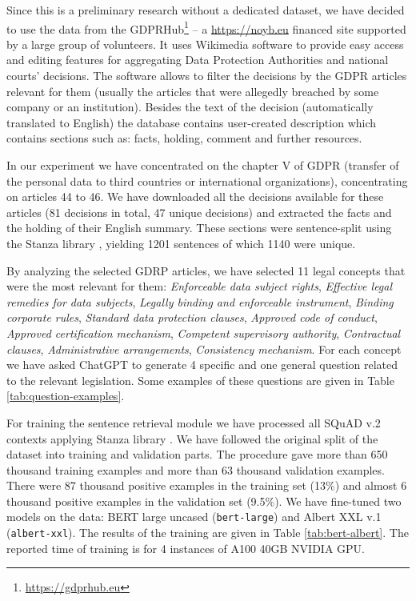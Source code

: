 Since this is a preliminary research without a dedicated dataset, we have decided to use the data from the GDPRHub\footnote{\url{https://gdprhub.eu}} -- a \url{https://noyb.eu} financed site supported by
a large group of volunteers. It uses Wikimedia software to provide easy access and editing features for 
aggregating Data Protection Authorities and national courts' decisions. The software  allows to filter the 
decisions by the GDPR articles relevant for them (usually the articles that were allegedly breached by some 
company or an institution). Besides the text of the decision (automatically translated to English) the database
contains user-created description which contains sections such as: facts, holding, comment and further resources.

In our experiment we have concentrated on the chapter V of GDPR (transfer of the personal data to third countries or 
international organizations), concentrating on articles 44 to 46. We have downloaded all the decisions available for 
these articles (81 decisions in total, 47 unique decisions) and extracted the facts and the holding of their English 
summary. These sections were sentence-split using the Stanza library \cite{qi2020stanza}, yielding 1201 sentences
of which 1140 were unique. 

By analyzing the selected GDRP articles, we have selected 11 legal concepts that were the most relevant for them:
\textit{Enforceable data subject rights}, \textit{Effective legal remedies for data subjects}, 
\textit{Legally binding and enforceable instrument},
\textit{Binding corporate rules}, \textit{Standard data protection clauses}, \textit{Approved code of conduct},
\textit{Approved certification mechanism}, \textit{Competent supervisory authority}, \textit{Contractual clauses},
\textit{Administrative arrangements}, \textit{Consistency mechanism}. For each concept we have asked ChatGPT 
to generate 4 specific and one general question related to the relevant legislation. Some examples of these
questions are given in Table \ref{tab:question-examples}.

For training the sentence retrieval module we have processed all SQuAD v.2 \cite{rajpurkar2018know} contexts applying Stanza 
library \cite{qi2020stanza}. We have followed the original split of the dataset into training and validation parts.
The procedure gave more than 650 thousand training examples and more than 63 thousand validation examples. There were 87 thousand
positive examples in the training set (13\%) and almost 6 thousand positive examples in the validation set (9.5\%).
We have fine-tuned two models on the data: BERT large uncased \cite{devlin2018bert} (\texttt{bert-large}) and 
Albert XXL v.1 \cite{lan2019albert} (\texttt{albert-xxl}). The results of the training are given in Table \ref{tab:bert-albert}.
The reported time of training is for 4 instances of A100 40GB NVIDIA GPU.

